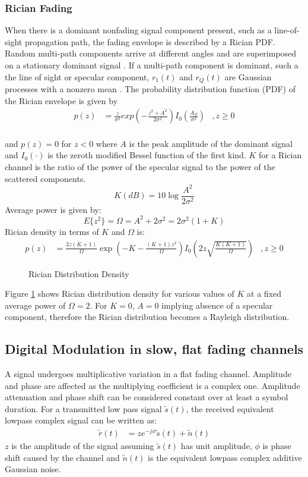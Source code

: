 \subsubsection{Rician Fading}
When there is a dominant nonfading signal component present, such as a line-of-sight propagation path, the fading envelope is described by a Rician \gls{PDF}\cite{AWGN}.
Random multi-path components arrive at different angles and are superimposed on a stationary dominant signal \cite{4vn}. If a multi-path component is dominant, such a the line of sight or specular component,  $r_1(t)$ and $r_Q(t)$ are Gaussian processes with a nonzero mean \cite{fuqin}. The probability distribution function (PDF) of the Rician envelope is given by
\begin{align}
p(z) &= \frac{z}{\sigma^2}\textit{exp}\left (-\frac{{z^2}+{A^2}}{2\sigma^2}\right)I_0 \left(\frac{A_Z}{\sigma^2}\right)&,  z\geq0 \label{eqn:rice_pdf}
\end{align}
\\and $p(z)=0$ for $z<0$ where $A$ is the peak amplitude of the dominant signal and $I_0(\cdot)$ is the zeroth modified Bessel function of the first kind\cite{fuqin}. $K$ for a Rician channel is the ratio of the power of the specular signal to the power of the scattered components\cite{Hindu}.
$$K(dB) = 10\log \frac{A^2}{2\sigma^2}$$
Average power is given by:
$$E\{z^2\} = \Omega = A^2 + 2\sigma^2 = 2\sigma^2(1+K)$$
Rician density in terms of $K$ and $\Omega$ is:
\begin{align*}
p(z) &= \frac{2z(K+1)}{\Omega}\exp\left(-K-\frac{(K+1)z^2}{\Omega}\right)I_0\left(2z\sqrt{\frac{K(K+1)}{\Omega}}\right) &, z\geq 0
\end{align*}
\begin{figure}[h!]
	\centerline{\resizebox{14cm}{!}{}}
	\caption{Rician Distribution Density}
	\label{fig:rice_pd}
\end{figure}
Figure \ref{fig:rice_pd} shows Rician distribution density for various values of $K$ at a fixed average power of $\Omega = 2$. For $K=0$, $A=0$ implying absence of a specular component, therefore the Rician distribution becomes a Rayleigh distribution.

\subsection{Digital Modulation in slow, flat fading channels}
A signal undergoes multiplicative variation in a flat fading channel. Amplitude and phase are affected as the multiplying coefficient is a complex one. Amplitude attenuation and phase shift can be considered constant over at least a symbol duration.
For a transmitted low pass signal $\tilde{s}(t)$, the received equivalent lowpass complex signal can be written as:
\begin{align}
\tilde{r}(t) &= ze^{-j\phi}\tilde{s}(t) + \tilde{n}(t)\label{eqn:sig_rec}
\end{align}
$z$ is the amplitude of the signal assuming $\tilde{s}(t)$ has unit amplitude, $\phi$ is phase shift caused by the channel and $\tilde{n}(t)$ is the equivalent lowpass complex additive Gaussian noise.

